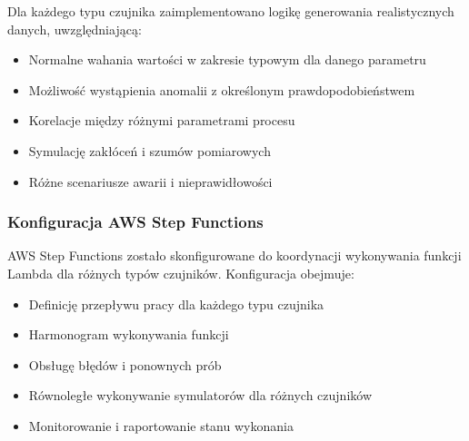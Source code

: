 Dla każdego typu czujnika zaimplementowano logikę generowania realistycznych danych, uwzględniającą:
\begin{itemize}
    \item Normalne wahania wartości w zakresie typowym dla danego parametru
    \item Możliwość wystąpienia anomalii z określonym prawdopodobieństwem
    \item Korelacje między różnymi parametrami procesu
    \item Symulację zakłóceń i szumów pomiarowych
    \item Różne scenariusze awarii i nieprawidłowości
\end{itemize}

\subsubsection{Konfiguracja AWS Step Functions}
\label{subsubsec:konfiguracja_step_functions}

AWS Step Functions zostało skonfigurowane do koordynacji wykonywania funkcji Lambda dla różnych typów czujników. Konfiguracja obejmuje:
\begin{itemize}
    \item Definicję przepływu pracy dla każdego typu czujnika
    \item Harmonogram wykonywania funkcji
    \item Obsługę błędów i ponownych prób
    \item Równoległe wykonywanie symulatorów dla różnych czujników
    \item Monitorowanie i raportowanie stanu wykonania
\end{itemize}
